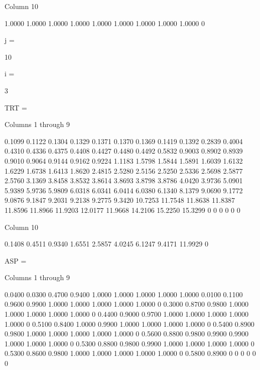  Column 10

    1.0000
    1.0000
    1.0000
    1.0000
    1.0000
    1.0000
    1.0000
    1.0000
    1.0000
         0


j =

    10


i =

     3


TRT =

  Columns 1 through 9

    0.1099    0.1122    0.1304    0.1329    0.1371    0.1370    0.1369    0.1419    0.1392
    0.2839    0.4004    0.4310    0.4336    0.4375    0.4408    0.4427    0.4480    0.4492
    0.5832    0.9003    0.8902    0.8939    0.9010    0.9064    0.9144    0.9162    0.9224
    1.1183    1.5798    1.5844    1.5891    1.6039    1.6132    1.6229    1.6738    1.6413
    1.8620    2.4815    2.5280    2.5156    2.5250    2.5336    2.5698    2.5877    2.5760
    3.1369    3.8458    3.8532    3.8614    3.8693    3.8798    3.8786    4.0420    3.9736
    5.0901    5.9389    5.9736    5.9809    6.0318    6.0341    6.0414    6.0380    6.1340
    8.1379    9.0690    9.1772    9.0876    9.1847    9.2031    9.2138    9.2775    9.3420
   10.7253   11.7548   11.8638   11.8387   11.8596   11.8966   11.9203   12.0177   11.9668
   14.2106   15.2250   15.3299         0         0         0         0         0         0

  Column 10

    0.1408
    0.4511
    0.9340
    1.6551
    2.5857
    4.0245
    6.1247
    9.4171
   11.9929
         0


ASP =

  Columns 1 through 9

    0.0400    0.0300    0.4700    0.9400    1.0000    1.0000    1.0000    1.0000    1.0000
    0.0100    0.1100    0.9600    0.9900    1.0000    1.0000    1.0000    1.0000    1.0000
         0    0.3000    0.8700    0.9800    1.0000    1.0000    1.0000    1.0000    1.0000
         0    0.4400    0.9000    0.9700    1.0000    1.0000    1.0000    1.0000    1.0000
         0    0.5100    0.8400    1.0000    0.9900    1.0000    1.0000    1.0000    1.0000
         0    0.5400    0.8900    0.9800    1.0000    1.0000    1.0000    1.0000    1.0000
         0    0.5600    0.8800    0.9800    0.9900    0.9900    1.0000    1.0000    1.0000
         0    0.5300    0.8800    0.9800    0.9900    1.0000    1.0000    1.0000    1.0000
         0    0.5300    0.8600    0.9800    1.0000    1.0000    1.0000    1.0000    1.0000
         0    0.5800    0.8900         0         0         0         0         0         0

